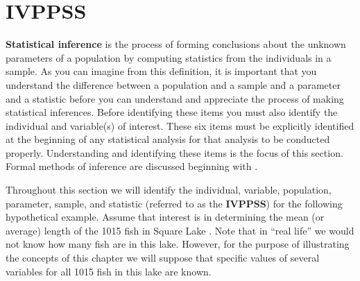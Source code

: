 \documentclass[10pt,openany]{book}\usepackage[]{graphicx}\usepackage[]{color}
\begin{document}
\section{IVPPSS}  \label{sect:IVPPSS}
\textbf{Statistical inference} is the process of forming conclusions about the unknown parameters of a population by computing statistics from the individuals in a sample.  As you can imagine from this definition, it is important that you understand the difference between a population and a sample and a parameter and a statistic before you can understand and appreciate the process of making statistical inferences.  Before identifying these items you must also identify the individual and variable(s) of interest.  These six items must be explicitly identified at the beginning of any statistical analysis for that analysis to be conducted properly.  Understanding and identifying these items is the focus of this section.  Formal methods of inference are discussed beginning with .


Throughout this section we will identify the individual, variable, population, parameter, sample, and statistic (referred to as the \textbf{IVPPSS}) for the following hypothetical example.  Assume that interest is in determining the mean (or average) length of the 1015 fish in Square Lake .  Note that in ``real life'' we would not know how many fish are in this lake.  However, for the purpose of illustrating the concepts of this chapter we will suppose that specific values of several variables for all 1015 fish in this lake are known.
\end{document}
